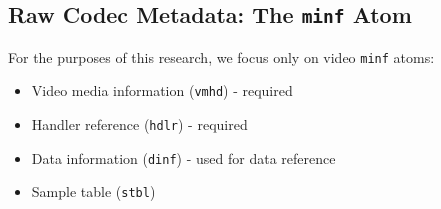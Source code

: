 \subsection{Raw Codec Metadata: The \texttt{minf} Atom}

For the purposes of this research, we focus only on video \texttt{minf} atoms:

\begin{itemize}
	\item Video media information (\texttt{vmhd}) - required
	\item Handler reference (\texttt{hdlr}) - required
	\item Data information (\texttt{dinf}) - used for data reference
	\item Sample table (\texttt{stbl})
\end{itemize}
%
